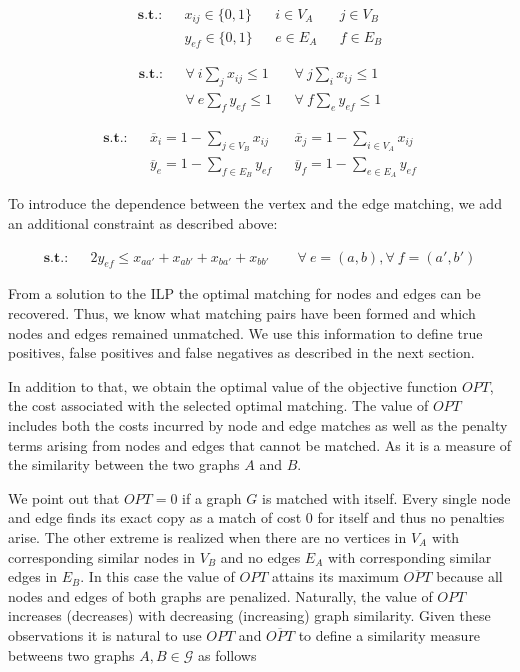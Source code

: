 		\begin{align}
		\textbf{s.t.:} 	&&x_{ij} \in \{0,1\} &&i \in V_A &&j \in V_B \\
						&&y_{ef} \in \{0,1\} &&e \in E_A &&f \in E_B                                    
		\end{align}

		\begin{align}
		\textbf{s.t.:} 	& &\forall \ i \sum_{j} x_{ij} \leq 1  &&\forall \ j \sum_{i} x_{ij} \leq 1 \\
						& &\forall \ e \sum_{f} y_{ef} \leq 1  &&\forall \ f \sum_{e} y_{ef} \leq 1				                               
		\end{align}

		\begin{align}
		\textbf{s.t.:} 	& &\overline{x}_{i} =  1 - \sum_{j \in V_B} x_{ij} &&\overline{x}_{j} =  1 - \sum_{i \in V_A} x_{ij} \\          
						& &\overline{y}_{e} =  1 - \sum_{f \in E_B} y_{ef} &&\overline{y}_{f} =  1 - \sum_{e \in E_A} y_{ef}                                        
		\end{align}

		To introduce the dependence between the vertex and the edge matching, we add an additional constraint as described above: 

		\begin{align}
			\textbf{s.t.:} 	& &2y_{ef} \leq x_{aa'} + x_{ab'} + x_{ba'} + x_{bb'}     \quad \quad \forall \ e = (a,b), \forall \ f = (a',b')          
		\end{align}

		From a solution to the ILP the optimal matching for nodes and edges can be recovered. Thus, we know what matching pairs have been formed and which nodes and edges remained unmatched. We use this information to define true positives, false positives and false negatives as described in the next section. 

		In addition to that, we obtain the optimal value of the objective function $OPT$, \ie the cost associated with the selected optimal matching. The value of $OPT$ includes both the costs incurred by node and edge matches as well as the penalty terms arising from nodes and edges that cannot be matched. As it is a measure of the similarity between the two graphs $A$ and $B$.

		We point out that $OPT = 0$ if a graph $G$ is matched with itself. Every single node and edge finds its exact copy as a match of cost $0$ for itself and thus no penalties arise. The other extreme is realized when there are no vertices in $V_A$ with corresponding similar nodes in $V_B$ and no edges $E_A$ with corresponding similar edges in $E_B$. In this case the value of $OPT$ attains its maximum $\overline{OPT}$ because all nodes and edges of both graphs are penalized. Naturally, the value of $OPT$ increases (decreases) with decreasing (increasing) graph similarity. Given these observations it is natural to use $OPT$ and $\overline{OPT}$ to define a similarity measure betweens two graphs $A, B \in \mathcal{G}$ as follows

